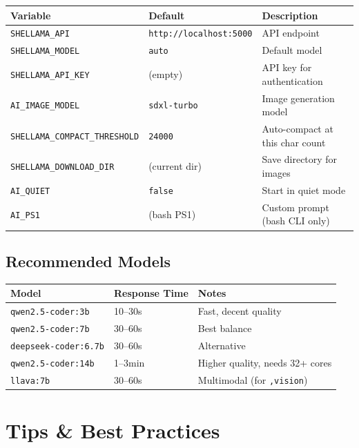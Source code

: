 \documentclass[11pt,a4paper]{article}
\begin{document}
\begin{longtable}{p{5.5cm}p{4cm}p{4.5cm}}
\toprule
\textbf{Variable} & \textbf{Default} & \textbf{Description} \\
\midrule
\texttt{SHELLAMA\_API} & \texttt{http://localhost:5000} & API endpoint \\
\texttt{SHELLAMA\_MODEL} & \texttt{auto} & Default model \\
\texttt{SHELLAMA\_API\_KEY} & (empty) & API key for authentication \\
\texttt{AI\_IMAGE\_MODEL} & \texttt{sdxl-turbo} & Image generation model \\
\texttt{SHELLAMA\_COMPACT\_THRESHOLD} & \texttt{24000} & Auto-compact at this char count \\
\texttt{SHELLAMA\_DOWNLOAD\_DIR} & (current dir) & Save directory for images \\
\texttt{AI\_QUIET} & \texttt{false} & Start in quiet mode \\
\texttt{AI\_PS1} & (bash PS1) & Custom prompt (bash CLI only) \\
\bottomrule
\end{longtable}

\subsection{Recommended Models}

\begin{longtable}{p{4.5cm}p{3cm}p{6cm}}
\toprule
\textbf{Model} & \textbf{Response Time} & \textbf{Notes} \\
\midrule
\texttt{qwen2.5-coder:3b} & 10--30s & Fast, decent quality \\
\texttt{qwen2.5-coder:7b} & 30--60s & Best balance \\
\texttt{deepseek-coder:6.7b} & 30--60s & Alternative \\
\texttt{qwen2.5-coder:14b} & 1--3min & Higher quality, needs 32+ cores \\
\texttt{llava:7b} & 30--60s & Multimodal (for \texttt{,vision}) \\
\bottomrule
\end{longtable}

\section{Tips \& Best Practices}
\end{document}
